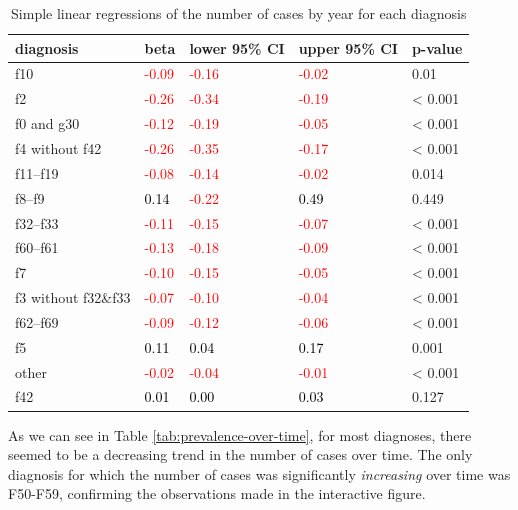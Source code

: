 \documentclass[
]{book}
\theoremstyle{definition}
\theoremstyle{definition}
\theoremstyle{definition}
\theoremstyle{definition}
\theoremstyle{remark}
\begin{document}
\begin{table}
\centering
\caption{\label{tab:cases-by-year}Simple linear regressions of the number of cases by year for each diagnosis}
\centering
\begin{tabular}[t]{l|>{}l|>{}l|>{}l|l}
\hline
diagnosis & beta & lower 95\% CI & upper 95\% CI & p-value\\
\hline
f10 & \textcolor{red}{-0.09} & \textcolor{red}{-0.16} & \textcolor{red}{-0.02} & 0.01\\
\hline
f2 & \textcolor{red}{-0.26} & \textcolor{red}{-0.34} & \textcolor{red}{-0.19} & < 0.001\\
\hline
f0 and g30 & \textcolor{red}{-0.12} & \textcolor{red}{-0.19} & \textcolor{red}{-0.05} & < 0.001\\
\hline
f4 without f42 & \textcolor{red}{-0.26} & \textcolor{red}{-0.35} & \textcolor{red}{-0.17} & < 0.001\\
\hline
f11–f19 & \textcolor{red}{-0.08} & \textcolor{red}{-0.14} & \textcolor{red}{-0.02} & 0.014\\
\hline
f8–f9 & \textcolor{black}{0.14} & \textcolor{red}{-0.22} & \textcolor{black}{0.49} & 0.449\\
\hline
f32–f33 & \textcolor{red}{-0.11} & \textcolor{red}{-0.15} & \textcolor{red}{-0.07} & < 0.001\\
\hline
f60–f61 & \textcolor{red}{-0.13} & \textcolor{red}{-0.18} & \textcolor{red}{-0.09} & < 0.001\\
\hline
f7 & \textcolor{red}{-0.10} & \textcolor{red}{-0.15} & \textcolor{red}{-0.05} & < 0.001\\
\hline
f3 without f32\&f33 & \textcolor{red}{-0.07} & \textcolor{red}{-0.10} & \textcolor{red}{-0.04} & < 0.001\\
\hline
f62–f69 & \textcolor{red}{-0.09} & \textcolor{red}{-0.12} & \textcolor{red}{-0.06} & < 0.001\\
\hline
f5 & \textcolor{black}{0.11} & \textcolor{black}{0.04} & \textcolor{black}{0.17} & 0.001\\
\hline
other & \textcolor{red}{-0.02} & \textcolor{red}{-0.04} & \textcolor{red}{-0.01} & < 0.001\\
\hline
f42 & \textcolor{black}{0.01} & \textcolor{black}{0.00} & \textcolor{black}{0.03} & 0.127\\
\hline
\end{tabular}
\end{table}

As we can see in Table \ref{tab:prevalence-over-time}, for most diagnoses, there seemed to be a decreasing trend in the number of cases over time. The only diagnosis for which the number of cases was significantly \emph{increasing} over time was F50-F59, confirming the observations made in the interactive figure.
\end{document}

